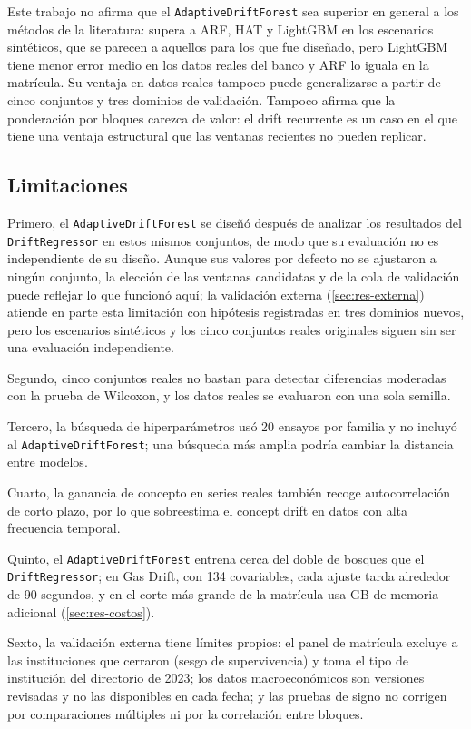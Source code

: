 \documentclass[11pt,a4paper]{article}
\begin{document}
Este trabajo no afirma que el \texttt{AdaptiveDriftForest} sea superior en general a los métodos de la
literatura: supera a ARF, HAT y LightGBM en los escenarios sintéticos, que se parecen a aquellos para los
que fue diseñado, pero LightGBM tiene menor error medio en los datos reales del banco y ARF lo iguala en
la matrícula. Su ventaja en datos reales tampoco puede generalizarse a partir de cinco conjuntos y tres
dominios de validación. Tampoco afirma que la ponderación por bloques carezca de
valor: el drift recurrente es un caso en el que tiene una ventaja estructural que las ventanas
recientes no pueden replicar.

\subsection{Limitaciones}\label{sec:limitaciones}

Primero, el \texttt{AdaptiveDriftForest} se diseñó después de analizar los resultados del
\texttt{DriftRegressor} en estos mismos conjuntos, de modo que su evaluación no es independiente de
su diseño. Aunque sus valores por defecto no se ajustaron a ningún conjunto, la elección de las
ventanas candidatas y de la cola de validación puede reflejar lo que funcionó aquí; la validación
externa (\cref{sec:res-externa}) atiende en parte esta limitación con hipótesis registradas en tres
dominios nuevos, pero los escenarios sintéticos y los cinco conjuntos reales originales siguen sin ser
una evaluación independiente.

Segundo, cinco conjuntos reales no bastan para detectar diferencias moderadas con la prueba de
Wilcoxon, y los datos reales se evaluaron con una sola semilla.

Tercero, la búsqueda de hiperparámetros usó 20 ensayos por familia y no incluyó al
\texttt{AdaptiveDriftForest}; una búsqueda más amplia podría cambiar la distancia entre modelos.

Cuarto, la ganancia de concepto en series reales también recoge autocorrelación de corto plazo, por
lo que sobreestima el concept drift en datos con alta frecuencia temporal.

Quinto, el \texttt{AdaptiveDriftForest} entrena cerca del doble de bosques que el
\texttt{DriftRegressor}; en Gas Drift, con 134 covariables, cada ajuste tarda alrededor de 90
segundos, y en el corte más grande de la matrícula usa \VcostoAdfRam{} GB de memoria adicional
(\cref{sec:res-costos}).

Sexto, la validación externa tiene límites propios: el panel de matrícula excluye a las instituciones que
cerraron (sesgo de supervivencia) y toma el tipo de institución del directorio de 2023; los datos
macroeconómicos son versiones revisadas y no las disponibles en cada fecha; y las pruebas de signo no
corrigen por comparaciones múltiples ni por la correlación entre bloques.
\end{document}
